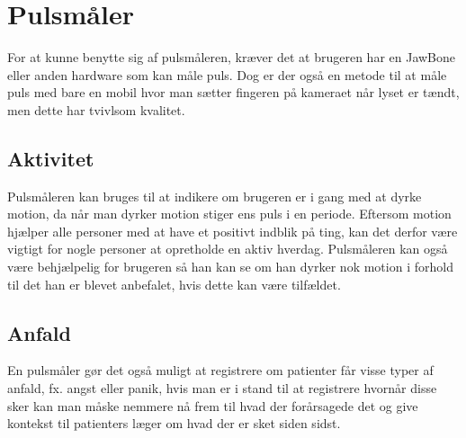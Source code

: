 \section{Pulsmåler}
For at kunne benytte sig af pulsmåleren, kræver det at brugeren har en JawBone eller anden hardware som kan måle puls. Dog er der også en metode til at måle puls med bare en mobil hvor man sætter fingeren på kameraet når lyset er tændt, men dette har tvivlsom kvalitet.

\subsection{Aktivitet}
Pulsmåleren kan bruges til at indikere om brugeren er i gang med at dyrke motion, da når man dyrker motion stiger ens puls i en periode.
Eftersom motion hjælper alle personer med at have et positivt indblik på ting, kan det derfor være vigtigt for nogle personer at opretholde en aktiv hverdag.
Pulsmåleren kan også være behjælpelig for brugeren så han kan se om han dyrker nok motion i forhold til det han er blevet anbefalet, hvis dette kan være tilfældet.

\subsection{Anfald}
En pulsmåler gør det også muligt at registrere om patienter får visse typer af anfald, fx. angst eller panik, hvis man er i stand til at registrere hvornår disse sker kan man måske nemmere nå frem til hvad der forårsagede det og give kontekst til patienters læger om hvad der er sket siden sidst.


